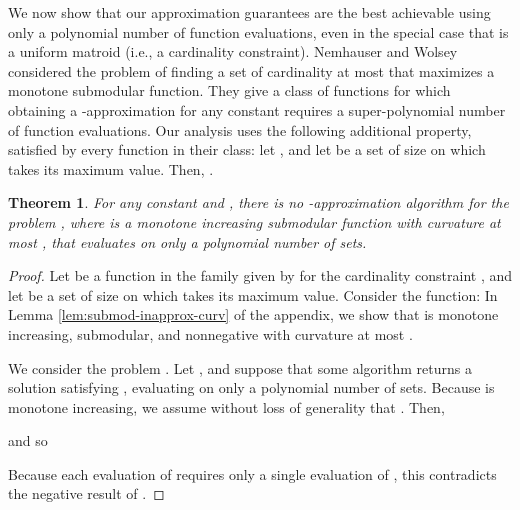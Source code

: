 \documentclass{article}
\newtheorem{theorem}{Theorem}[section]
\theoremstyle{definition}
\begin{document}
We now show that our approximation guarantees are the best achievable using only a polynomial number of function evaluations, even in the special case that  is a uniform matroid (i.e., a cardinality constraint).  Nemhauser and Wolsey \cite{Nemhauser1978} considered the problem of finding a set  of cardinality at most  that maximizes a monotone submodular function. They give a class of functions for which obtaining a -approximation for any constant  requires a super-polynomial number of function evaluations. Our analysis uses the following additional property, satisfied by every function  in their class: let , and let  be a set of size  on which  takes its maximum value.  Then, .
\begin{theorem}
\label{lem:submod-inapprox}
For any constant  and , there is no -approximation algorithm for the problem , where  is a monotone increasing submodular function with curvature at most , that evaluates  on only a polynomial number of sets.
\end{theorem}
\begin{proof}
Let  be a function in the family given by \cite{Nemhauser1978} for the cardinality constraint , and let  be a set of size  on which  takes its maximum value.  Consider the function:    In Lemma \ref{lem:submod-inapprox-curv} of the appendix, we show that  is monotone increasing, submodular, and nonnegative with curvature at most .

We consider the problem .  Let , and suppose that some algorithm returns a solution  satisfying , evaluating  on only a polynomial number of sets.  Because  is monotone increasing, we assume without loss of generality that . Then,

and so

Because each evaluation of  requires only a single evaluation of , this contradicts the negative result of \cite{Nemhauser1978}.
\end{proof}
\end{document}
